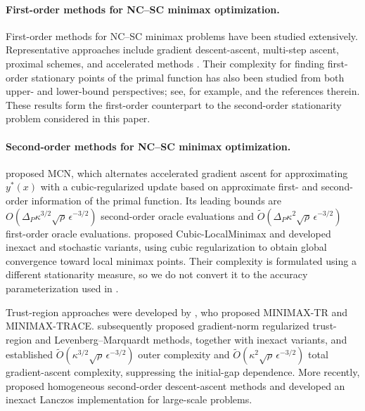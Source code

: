 \documentclass{article}
\begin{document}
\paragraph{First-order methods for NC--SC minimax optimization.}
First-order methods for NC--SC minimax problems have been studied
extensively. Representative approaches include gradient
descent-ascent, multi-step ascent, proximal schemes, and accelerated
methods
\citep{nouiehed2019solving,lin2020gradient,lin2020near}.
Their complexity for finding first-order stationary points of the
primal function has also been studied from both upper- and lower-bound
perspectives; see, for example, \citet{zhang2021complexity} and the
references therein. These results form the first-order counterpart to
the second-order stationarity problem considered in this paper.

\paragraph{Second-order methods for NC--SC minimax optimization.}
\citet{luo2022finding} proposed MCN, which alternates accelerated
gradient ascent for approximating $y^*(x)$ with a cubic-regularized
update based on approximate first- and second-order information of the
primal function. Its leading bounds are
$O(\Delta_P\kappa^{3/2}\sqrt\rho\,\epsilon^{-3/2})$ second-order
oracle evaluations and
$\widetilde O(\Delta_P\kappa^2\sqrt\rho\,\epsilon^{-3/2})$
first-order oracle evaluations.
\citet{chen2023cubic} proposed Cubic-LocalMinimax and developed
inexact and stochastic variants, using cubic regularization to obtain
global convergence toward local minimax points. Their complexity is
formulated using a different stationarity measure, so we do not
convert it to the accuracy parameterization used in
.

Trust-region approaches were developed by \citet{yao2025trust}, who
proposed MINIMAX-TR and MINIMAX-TRACE.
\citet{wang2025gradient} subsequently proposed gradient-norm
regularized trust-region and Levenberg--Marquardt methods, together
with inexact variants, and established
$\widetilde O(\kappa^{3/2}\sqrt\rho\,\epsilon^{-3/2})$ outer
complexity and
$\widetilde O(\kappa^2\sqrt\rho\,\epsilon^{-3/2})$ total
gradient-ascent complexity, suppressing the initial-gap dependence.
More recently, \citet{chen2026hsda} proposed homogeneous second-order
descent-ascent methods and developed an inexact Lanczos implementation
for large-scale problems.
\end{document}
